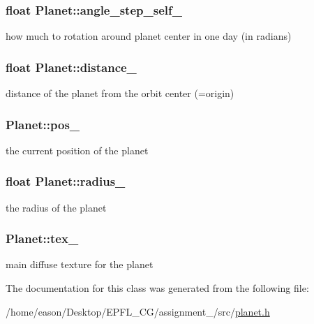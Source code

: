 \subsubsection[{\texorpdfstring{angle\+\_\+step\+\_\+self\+\_\+}{angle_step_self_}}]{\setlength{\rightskip}{0pt plus 5cm}float Planet\+::angle\+\_\+step\+\_\+self\+\_\+}\hypertarget{classPlanet_ab394e2d2c073a18f3dcd692b8ea62f68}{}\label{classPlanet_ab394e2d2c073a18f3dcd692b8ea62f68}


how much to rotation around planet center in one day (in radians) 

\subsubsection[{\texorpdfstring{distance\+\_\+}{distance_}}]{\setlength{\rightskip}{0pt plus 5cm}float Planet\+::distance\+\_\+}\hypertarget{classPlanet_a5179a41d97c015b373b6e8a3f4458f64}{}\label{classPlanet_a5179a41d97c015b373b6e8a3f4458f64}


distance of the planet from the orbit center (=origin) 

\subsubsection[{\texorpdfstring{pos\+\_\+}{pos_}}]{ Planet\+::pos\+\_\+}\hypertarget{classPlanet_aaa60c7184864fe744dcf1fd52a5bae82}{}\label{classPlanet_aaa60c7184864fe744dcf1fd52a5bae82}


the current position of the planet 

\subsubsection[{\texorpdfstring{radius\+\_\+}{radius_}}]{\setlength{\rightskip}{0pt plus 5cm}float Planet\+::radius\+\_\+}\hypertarget{classPlanet_a9d7230f0afaedba54afa25462639de08}{}\label{classPlanet_a9d7230f0afaedba54afa25462639de08}


the radius of the planet 

\subsubsection[{\texorpdfstring{tex\+\_\+}{tex_}}]{ Planet\+::tex\+\_\+}\hypertarget{classPlanet_a96a79b3b253480e586f7be9d66e3ef90}{}\label{classPlanet_a96a79b3b253480e586f7be9d66e3ef90}


main diffuse texture for the planet 



The documentation for this class was generated from the following file\+:\begin{DoxyCompactItemize}
\item 
/home/eason/\+Desktop/\+E\+P\+F\+L\+\_\+\+C\+G/assignment\+\_/src/\hyperlink{planet_8h}{planet.\+h}\end{DoxyCompactItemize}

